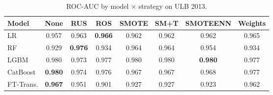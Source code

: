 \begin{table}[ht!]
\centering
\caption{ROC-AUC by model $\times$ strategy on ULB 2013.}
\label{tab:factorial_ulb_rocauc}
\begin{tabular}{l c c c c c c c}
\toprule
Model & None & RUS & ROS & SMOTE & SM+T & SMOTEENN & Weights \\
\midrule
LR         & 0.957 & 0.963 & \textbf{0.966} & 0.962 & 0.962 & 0.962 & 0.965 \\
RF         & 0.929 & \textbf{0.976} & 0.934 & 0.964 & 0.964 & 0.954 & 0.934 \\
LGBM       & 0.980 & 0.973 & 0.977 & 0.980 & 0.980 & \textbf{0.980} & 0.977 \\
CatBoost   & \textbf{0.980} & 0.974 & 0.976 & 0.967 & 0.967 & 0.968 & 0.977 \\
FT-Trans.  & \textbf{0.967} & 0.951 & 0.901 & 0.927 & 0.927 & 0.923 & 0.962 \\
\bottomrule
\end{tabular}
\end{table}